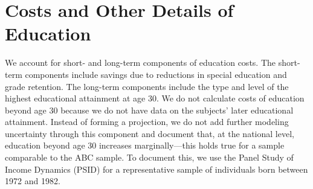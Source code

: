 \section{Costs and Other Details of Education} \label{appendix:education}

\noindent We account for short- and long-term components of education costs. The short-term components include savings due to reductions in special education and grade retention. The long-term components include the type and level of the highest educational attainment at age 30. We do not calculate costs of education beyond age 30 because we do not have data on the subjects' later educational attainment. Instead of forming a projection, we do not add further modeling uncertainty through this component and document that, at the national level, education beyond age 30 increases marginally---this holds true for a sample comparable to the ABC sample. To document this, we use the  Panel Study of Income Dynamics (PSID) for a representative sample of individuals born between 1972 and 1982. \\

